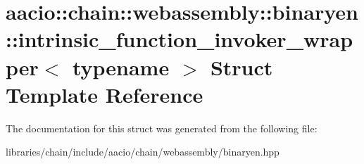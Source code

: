 \hypertarget{structaacio_1_1chain_1_1webassembly_1_1binaryen_1_1intrinsic__function__invoker__wrapper}{}\section{aacio\+:\+:chain\+:\+:webassembly\+:\+:binaryen\+:\+:intrinsic\+\_\+function\+\_\+invoker\+\_\+wrapper$<$ typename $>$ Struct Template Reference}
\label{structaacio_1_1chain_1_1webassembly_1_1binaryen_1_1intrinsic__function__invoker__wrapper}


The documentation for this struct was generated from the following file\+:\begin{DoxyCompactItemize}
\item 
libraries/chain/include/aacio/chain/webassembly/binaryen.\+hpp\end{DoxyCompactItemize}
